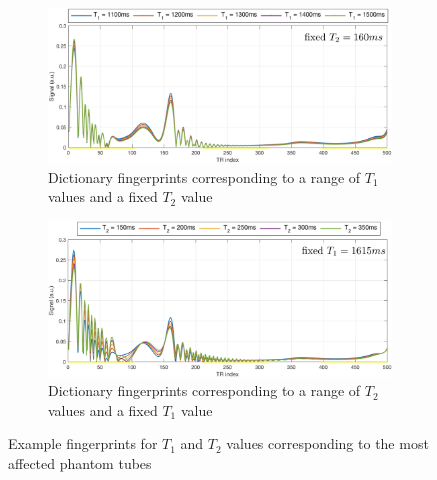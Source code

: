 \begin{figure}[ht]
    \centering
    \begin{subfigure}[b]{.85\textwidth}
        \includegraphics[width=\textwidth]{images/mrf/FixedT2VaryT1TubesMotion}
        \caption{Dictionary fingerprints corresponding to a range of $T_1$ values and a fixed $T_2$ value}
    \end{subfigure}
    
    \begin{subfigure}[b]{.85\textwidth}
        \includegraphics[width=\textwidth]{images/mrf/FixedT1VaryT2TubesMotion}
        \caption{Dictionary fingerprints corresponding to a range of $T_2$ values and a fixed $T_1$ value}
    \end{subfigure}
    
    \caption{Example fingerprints for $T_1$ and $T_2$ values corresponding to the most affected phantom tubes}
    \label{fig:problematicfingerprints}
\end{figure}

